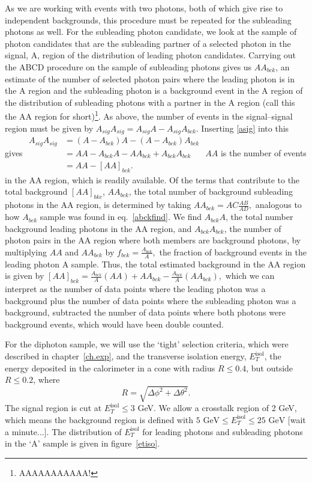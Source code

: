 As we are working with events with two photons, both of which give rise to independent backgrounds, this procedure must be repeated for the subleading photons as well. For the subleading photon candidate, we look at the sample of photon candidates that are the subleading partner of a selected photon in the signal, A, region of the distribution of leading photon candidates. Carrying out the ABCD procedure on the sample of subleading photons gives us $AA_{bck}$, an estimate of the number of selected photon pairs where the leading photon is in the A region and the subleading photon is a background event in the A region of the distribution of subleading photons with a partner in the A region (call this the AA region for short)\footnote{AAAAAAAAAAA!}. As above, the number of events in the signal--signal region must be given by
\(A_{sig}A_{sig} = A_{sig}A-A_{sig}A_{bck}.\)
Inserting \eqref{asig} into this gives
\(\begin{aligned}
A_{sig}A_{sig} &=(A-A_{bck})A-(A-A_{bck})A_{bck}\\ &=AA-A_{bck}A-AA_{bck}+A_{bck}A_{bck}\\&=AA-[AA]_{bck}.
\end{aligned}\)
$AA$ is the number of events in the AA region, which is readily available. Of the terms that contribute to the total background $[AA]_{bkc}$, $AA_{bck}$, the total number of background subleading photons in the AA region, is determined by taking
\(AA_{bck}=AC\frac{AB}{AD},\)
analogous to how $A_{bck}$ sample was found in eq.~\eqref{abckfind}. We find $A_{bck}A$, the total number background leading photons in the AA region, and $A_{bck}A_{bck}$, the number of photon pairs in the AA region where both members are background photons, by multiplying $AA$ and $AA_{bck}$ by
\(f_{bck}=\frac{A_{bck}}{A},\)
the fraction of background events in the leading photon A sample. Thus, the total estimated background in the AA region is given by
\([AA]_{bck}=\frac{A_{bck}}{A}(AA)+AA_{bck}-\frac{A_{bck}}{A}(AA_{bck}),\)
which we can interpret as the number of data points where the leading photon was a background plus the number of data points where the subleading photon was a background, subtracted the number of data points where both photons were background events, which would have been double counted.

For the diphoton sample, we will use the `tight' selection criteria, which were described in chapter~\ref{ch.exp}, and the transverse isolation energy, $E_T^{\text{isol}}$, the energy deposited in the calorimeter in a cone with radius $R\le0.4$, but outside $R\le0.2$, where
\[R=\sqrt{\Delta\phi^2+\Delta\theta^2}.\]
The signal region is cut at $E_T^{\text{isol}}\le3$ GeV. We allow a crosstalk region of 2 GeV, which means the background region is defined with $5\text{ GeV}\le E_T^{\text{isol}}\le25\text{ GeV}$ [wait a minute...]. The distribution of $E_T^{\text{isol}}$ for leading photons and subleading photons in the `A' sample is given in figure~\ref{etiso}.

